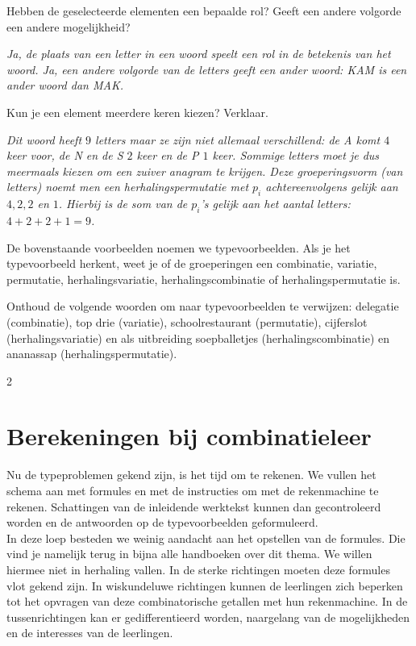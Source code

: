 \begin{werktekstoef}
\setcounter{enumi}{4}
\item {Hebben de geselecteerde elementen een bepaalde rol? Geeft een andere volgorde een andere mogelijkheid?}

\emph{Ja, de plaats van een letter in een woord speelt een rol in de betekenis van het woord. Ja, een andere volgorde van de letters geeft een ander woord: KAM is een ander woord dan MAK.}

\item {Kun je een element meerdere keren kiezen? Verklaar.}

\emph{Dit woord heeft $9$ letters maar ze zijn niet allemaal verschillend: de A komt $4$ keer voor, de N en de S $2$ keer en de P $1$ keer. Sommige letters moet je dus meermaals kiezen om een zuiver anagram te krijgen. Deze  groeperingsvorm (van letters) noemt men een herhalingspermutatie met $p_i$ achtereenvolgens gelijk aan $4, 2, 2$ en $1$. Hierbij is de som van de $p_i$'s gelijk aan het aantal letters: $4+2+2+1=9$.}

\end{werktekstoef}
De bovenstaande voorbeelden noemen we typevoorbeelden. Als je het typevoorbeeld herkent, weet je of de groeperingen een combinatie, variatie, permutatie, herhalingsvariatie, herhalingscombinatie of herhalingspermutatie is. 

Onthoud de volgende woorden om naar typevoorbeelden te verwijzen: delegatie (combinatie), top drie (variatie), schoolrestaurant (permutatie), cijferslot (herhalingsvariatie) en als uitbreiding soepballetjes (herhalingscombinatie) en ananassap (herhalingspermutatie).

\eindewerktekst

\begin{multicols}{2}

\section{Berekeningen bij combinatieleer}
Nu de typeproblemen gekend zijn, is het tijd om te rekenen. We vullen het schema aan met formules en met de instructies om met de rekenmachine te rekenen. Schattingen van de inleidende werktekst kunnen dan gecontroleerd worden en de antwoorden op de typevoorbeelden geformuleerd.\\ 

In deze loep besteden we weinig aandacht aan het opstellen van de formules. Die vind je namelijk terug in bijna alle handboeken over dit thema. We willen hiermee niet in herhaling vallen. In de sterke richtingen moeten deze formules vlot gekend zijn. In wiskundeluwe richtingen kunnen de leerlingen zich beperken tot het  opvragen van deze combinatorische getallen met hun rekenmachine. In de tussenrichtingen kan er gedifferentieerd worden, naargelang van de mogelijkheden en de interesses van de leerlingen.
\end{multicols}

